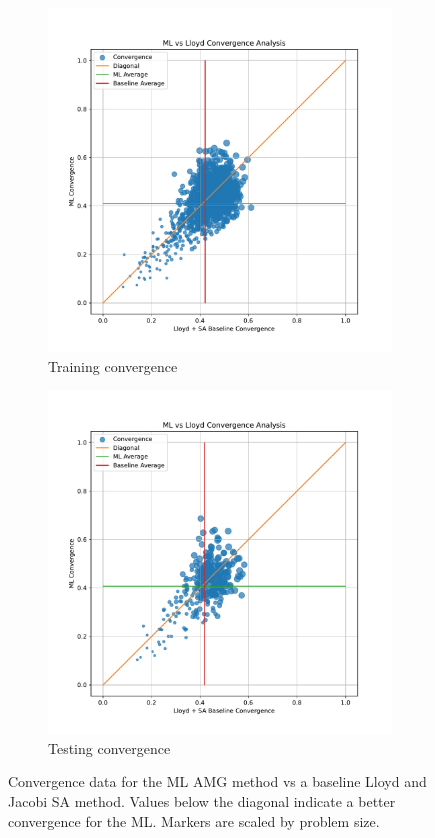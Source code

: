 \documentclass{article}
\begin{document}
\begin{figure}[h]
  \centering
  \begin{subfigure}[t]{0.49\textwidth}
    \centering
    \includegraphics[width=\textwidth]{iso_train_convergence.pdf}
    \caption{Training convergence}
  \end{subfigure}
  \begin{subfigure}[t]{0.49\textwidth}
    \centering
    \includegraphics[width=\textwidth]{iso_test_convergence.pdf}
    \caption{Testing convergence}
  \end{subfigure}
  \caption{Convergence data for the ML AMG method vs a baseline Lloyd and Jacobi SA method.  Values below the diagonal indicate a better convergence for the ML.  Markers are scaled by problem size.}
  \label{fig:conv}
\end{figure}
\end{document}
